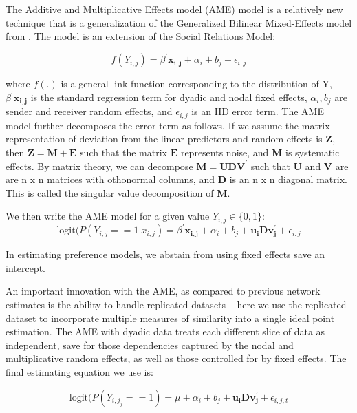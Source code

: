 The Additive and Multiplicative Effects model (AME) model is a relatively new technique that is a generalization of the Generalized Bilinear Mixed-Effects model from \citet{hoff:2005}. The model is an extension of the Social Relations Model: 

\begin{equation}
f(Y_{i,j}) =  \beta^{'}\mathbf{x_{i,j}} + \alpha_{i} + b_{j} + \epsilon_{i,j}
\end{equation}

where $f(.)$ is a general link function corresponding to the distribution of Y, $\beta^{'}\mathbf{x_{i,j}}$ is the standard regression term for dyadic and nodal fixed effects,  $\alpha_{i}, b_{j}$ are sender and receiver random effects, and $\epsilon_{i,j}$ is an IID error term. The AME model further decomposes the  error term as follows. If we assume the matrix representation of deviation from the linear predictors and random effects is $\mathbf{Z}$, then $\mathbf{Z} = \mathbf{M} + \mathbf{E}$ such that the matrix $\mathbf{E}$ represents noise, and $\mathbf{M}$ is systematic effects. By matrix theory, we can decompose $\mathbf{M} = \mathbf{UDV^{'}}$ such that $\mathbf{U}$ and $\mathbf{V}$ are are n x n matrices with othonormal columns, and $\mathbf{D}$ is an n x n diagonal matrix. This is called the singular value decomposition of $\mathbf{M}$. 

We then write the AME model for a given value $Y_{i,j} \in \{0,1\}$:
\begin{equation}
\text{logit}(P(Y_{i,j} == 1| x_{i,j}) = \beta^{'}\mathbf{x_{i,j}} + \alpha_{i} + b_{j} + \mathbf{u_{i}Dv^{'}_{j}} + \epsilon_{i,j}
\end{equation}

In estimating preference models, we abstain from using fixed effects save an intercept.

An important innovation with the AME, as compared to previous network estimates is the ability to handle replicated datasets -- here we use the replicated dataset to incorporate multiple measures of similarity into a single ideal point estimation.  The AME with dyadic data treats each different slice of data as independent, save for those dependencies captured by the nodal and multiplicative random effects, as well as those controlled for by fixed effects. The final estimating equation we use is:

\begin{equation}
\text{logit}(P(Y_{i,j_j} == 1) = \mu + \alpha_{i} + b_{j} + \mathbf{u_{i}Dv^{'}_{j}} + \epsilon_{i,j,t}
\end{equation}

